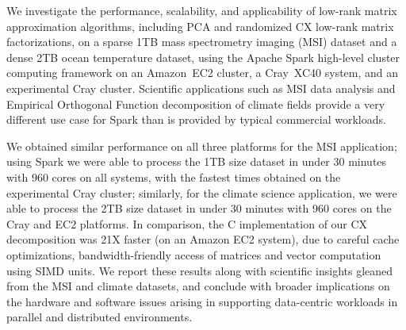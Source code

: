 We investigate the performance, scalability, and applicability of low-rank
matrix approximation algorithms, including PCA and randomized CX low-rank
matrix factorizations, on a sparse 1TB mass spectrometry imaging (MSI) dataset
and a dense 2TB ocean temperature dataset, using the Apache Spark high-level
cluster computing framework on an Amazon~EC2 cluster, a Cray~XC40 system, and
an experimental Cray cluster. Scientific applications such as MSI data
analysis and Empirical Orthogonal Function decomposition of climate fields
provide a very different use case for Spark than is provided by typical commercial
workloads.

We obtained similar performance on all three platforms
for the MSI application; using Spark we were able to process the 1TB size
dataset in under 30 minutes with 960 cores on all systems, with the fastest
times obtained on the experimental Cray cluster; similarly, for the climate
science application, we were able to process the 2TB size dataset in under 30
minutes with 960 cores on the Cray and EC2 platforms. In comparison, the C
implementation of our CX decomposition was 21X faster (on an Amazon EC2
system), due to careful cache optimizations, bandwidth-friendly access of
matrices and vector computation using SIMD units. 
We report these results along with scientific insights gleaned from the
MSI and climate datasets, and conclude with broader implications on the
hardware and software issues arising in supporting data-centric workloads in
parallel and distributed environments.
